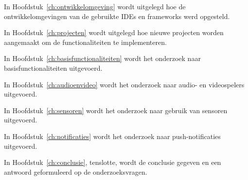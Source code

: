 In Hoofdstuk~\ref{ch:ontwikkelomgeving} wordt uitgelegd hoe de ontwikkelomgevingen van de gebruikte IDEs en frameworks werd opgesteld.

In Hoofdstuk~\ref{ch:projecten} wordt uitgelegd hoe nieuwe projecten worden aangemaakt om de functionaliteiten te implementeren.

In Hoofdstuk~\ref{ch:basisfunctionaliteiten} wordt het onderzoek naar basisfunctionaliteiten uitgevoerd.

In Hoofdstuk~\ref{ch:audioenvideo} wordt het onderzoek naar audio- en videospelers uitgevoerd.

In Hoofdstuk~\ref{ch:sensoren} wordt het onderzoek naar gebruik van sensoren uitgevoerd.

In Hoofdstuk~\ref{ch:notificaties} wordt het onderzoek naar push-notificaties uitgevoerd.

In Hoofdstuk~\ref{ch:conclusie}, tenslotte, wordt de conclusie gegeven en een antwoord geformuleerd op de onderzoeksvragen.













